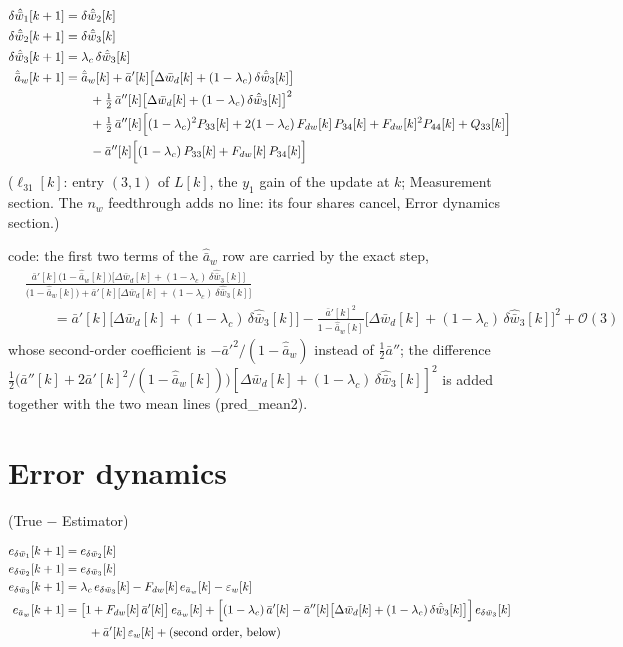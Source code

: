 \documentclass[11pt,a4paper,fontset=none]{ctexart}
\newcommand{\ba}{\bar{a}}
\newcommand{\bw}{\bar{w}}
\begin{document}
\begin{align*}
\delta\hat{\bw}_1[k+1] &= \delta\hat{\bw}_2[k] \\
\delta\hat{\bw}_2[k+1] &= \delta\hat{\bw}_3[k] \\
\delta\hat{\bw}_3[k+1] &= \lambda_c\,\delta\hat{\bw}_3[k] \\
\hat{\ba}_w[k+1]       &= \hat{\ba}_w[k]
  + \ba'[k]\bigl[\Delta\bw_d[k] + (1-\lambda_c)\,\delta\hat{\bw}_3[k]\bigr] \\
  &\qquad + \tfrac{1}{2}\,\ba''[k]\bigl[\Delta\bw_d[k] + (1-\lambda_c)\,\delta\hat{\bw}_3[k]\bigr]^{2} \\
  &\qquad + \tfrac{1}{2}\,\ba''[k]\Bigl[(1-\lambda_c)^{2}P_{33}[k]
    + 2(1-\lambda_c)\,F_{dw}[k]\,P_{34}[k] + F_{dw}[k]^{2}P_{44}[k] + Q_{33}[k]\Bigr] \\
  &\qquad - \ba''[k]\Bigl[(1-\lambda_c)\,P_{33}[k] + F_{dw}[k]\,P_{34}[k]\Bigr]
\end{align*}
($\ell_{31}[k]$: entry $(3,1)$ of $L[k]$, the $y_1$ gain of the update at $k$; Measurement section.
The $n_w$ feedthrough adds no line: its four shares cancel, Error dynamics section.)

code: the first two terms of the $\hat{\ba}_w$ row are carried by the exact step,
\begin{align*}
&\frac{\ba'[k]\bigl(1-\hat{\ba}_w[k]\bigr)\bigl[\Delta\bw_d[k] + (1-\lambda_c)\,\delta\hat{\bw}_3[k]\bigr]}
     {\bigl(1-\hat{\ba}_w[k]\bigr) + \ba'[k]\bigl[\Delta\bw_d[k] + (1-\lambda_c)\,\delta\hat{\bw}_3[k]\bigr]} \\
&\qquad = \ba'[k]\bigl[\Delta\bw_d[k] + (1-\lambda_c)\,\delta\hat{\bw}_3[k]\bigr]
   - \frac{\ba'[k]^{2}}{1-\hat{\ba}_w[k]}\bigl[\Delta\bw_d[k] + (1-\lambda_c)\,\delta\hat{\bw}_3[k]\bigr]^{2} + \mathcal{O}(3)
\end{align*}
whose second-order coefficient is $-\ba'^{2}/(1-\hat{\ba}_w)$ instead of $\tfrac{1}{2}\ba''$;
the difference $\tfrac{1}{2}\bigl(\ba''[k] + 2\ba'[k]^{2}/(1-\hat{\ba}_w[k])\bigr)
[\Delta\bw_d[k] + (1-\lambda_c)\,\delta\hat{\bw}_3[k]]^{2}$ is added together with the
two mean lines (pred\_mean2).

\section{Error dynamics}

(True $-$ Estimator)

\begin{align*}
e_{\delta\bw_1}[k+1] &= e_{\delta\bw_2}[k] \\
e_{\delta\bw_2}[k+1] &= e_{\delta\bw_3}[k] \\
e_{\delta\bw_3}[k+1] &= \lambda_c\,e_{\delta\bw_3}[k] - F_{dw}[k]\,e_{\ba_w}[k] - \varepsilon_w[k] \\
e_{\ba_w}[k+1] &= \bigl[1 + F_{dw}[k]\,\ba'[k]\bigr]\,e_{\ba_w}[k]
  + \Bigl[(1-\lambda_c)\,\ba'[k] - \ba''[k]\bigl[\Delta\bw_d[k] + (1-\lambda_c)\,\delta\hat{\bw}_3[k]\bigr]\Bigr]\,e_{\delta\bw_3}[k] \\
  &\qquad + \ba'[k]\,\varepsilon_w[k] + \text{(second order, below)}
\end{align*}
\end{document}
